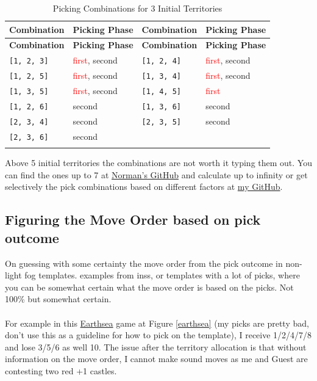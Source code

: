 \small
\begin{longtable}{|p{2.5cm}|p{2.5cm}||p{2.5cm}|p{2.5cm}|}
\hline
\rowcolor{black!20}
\textbf{Combination} & \textbf{Picking Phase} & \textbf{Combination} & \textbf{Picking Phase} \\ \hline
\endfirsthead

\hline
\rowcolor{black!20}
\textbf{Combination} & \textbf{Picking Phase} & \textbf{Combination} & \textbf{Picking Phase} \\ \hline
\endhead

\texttt{[1, 2, 3]} & \textcolor{red}{first}, \textcolor{CustomBlue}{second} & \texttt{[1, 2, 4]} & \textcolor{red}{first}, \textcolor{CustomBlue}{second} \\ \hline
\texttt{[1, 2, 5]} & \textcolor{red}{first}, \textcolor{CustomBlue}{second} & \texttt{[1, 3, 4]} & \textcolor{red}{first}, \textcolor{CustomBlue}{second} \\ \hline
\texttt{[1, 3, 5]} & \textcolor{red}{first}, \textcolor{CustomBlue}{second} & \texttt{[1, 4, 5]} & \textcolor{red}{first} \\ \hline
\texttt{[1, 2, 6]} & \textcolor{CustomBlue}{second} & \texttt{[1, 3, 6]} & \textcolor{CustomBlue}{second} \\ \hline
\texttt{[2, 3, 4]} & \textcolor{CustomBlue}{second} & \texttt{[2, 3, 5]} & \textcolor{CustomBlue}{second} \\ \hline
\texttt{[2, 3, 6]} & \textcolor{CustomBlue}{second} & & \\ \hline

\caption{Picking Combinations for 3 Initial Territories}
\label{tab:3territories}
\end{longtable}

\normalsize

Above 5 initial territories the combinations are not worth it typing them out. You can find the ones up to 7 at \href{https://github.com/Norman1/WarLight-pick-combinations}{Norman's GitHub} and calculate up to infinity or get selectively the pick combinations based on different factors at \href{https://github.com/5siell/wz-random-code/blob/main/picks/pick_combinations.ipynb}{my GitHub}.
\subsection{Figuring the Move Order based on pick outcome}

On guessing with some certainty the move order from the pick outcome in non-light fog templates. examples from inss, or templates with a lot of picks, where you can be somewhat certain what the move order is based on the picks. Not 100\% but somewhat certain. 
\\
\\
For example in this \href{https://www.warzone.com/MultiPlayer?GameID=40500155}{Earthsea} game at Figure \ref{earthsea} (my picks are pretty bad, don't use this as a guideline for how to pick on the template), I receive 1/2/4/7/8 and lose 3/5/6 as well 10. The issue after the territory allocation is that without information on the move order, I cannot make sound moves as me and Guest are contesting two red +1 castles.

